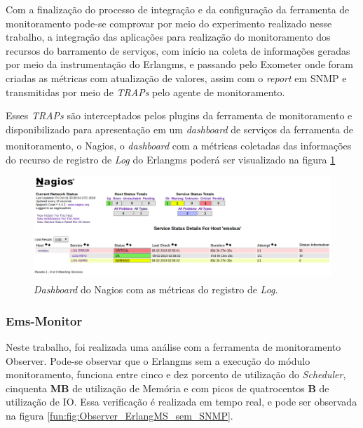 Com a finalização do processo de integração e da configuração da ferramenta de monitoramento pode-se comprovar por meio do experimento realizado nesse trabalho, a integração das aplicações para realização do monitoramento dos recursos do barramento de serviços, com início na coleta de informações geradas por meio da instrumentação do Erlangms, e passando pelo Exometer onde foram criadas as métricas com atualização de valores, assim com o \textit{report} em \acrshort{SNMP} e transmitidas por meio de \textit{TRAPs} pelo agente de monitoramento. 

Esses \textit{TRAPs} são interceptados pelos plugins da ferramenta de monitoramento e disponibilizado para apresentação em um \textit{dashboard} de serviços da ferramenta de monitoramento, o Nagios\textsuperscript{\textregistered}, o \textit{dashboard} com a métricas coletadas das informações do recurso de registro de \textit{Log} do Erlangms poderá ser visualizado na figura \ref{fun:fig:nagiosDashbordEmsbus}

\begin{figure}[H]
    \centering
    \includegraphics[scale = 0.57]{img/nagiosConfigurado.png}
    \caption{\textit{Dashboard} do Nagios\textsuperscript{\textregistered} com as métricas do registro de \textit{Log}.}
    \label{fun:fig:nagiosDashbordEmsbus}
\end{figure}

\subsubsection{Ems-Monitor}

Neste trabalho, foi realizada uma análise com a ferramenta de monitoramento Observer. Pode-se observar que o Erlangms sem a execução do módulo monitoramento, funciona entre cinco e dez porcento de utilização do \textit{Scheduler}, cinquenta \textbf{MB} de utilização de Memória e com picos de quatrocentos \textbf{B} de utilização de IO. Essa verificação é realizada em tempo real, e pode ser observada na figura \ref{fun:fig:Observer_ErlangMS_sem_SNMP}.


